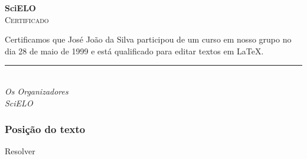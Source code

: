 \begin{frame}[plain]
  \begin{center}
    {\huge\textbf{SciELO}}\\[2em]
    {\LARGE\textsc{Certificado}}
  \end{center}

    \noindent Certificamos que José João da Silva participou de um curso em
    nosso grupo no dia 28 de maio de 1999 e está qualificado para editar textos
    em \LaTeX.

    \vfill
    \begin{flushright}
      \rule{}{.4pt}\\
      \emph{Os Organizadores}\\
      \emph{SciELO}\\
    \end{flushright}
\end{frame}

\begin{frame}
  \frametitle{Posição do texto}
  \huge
  Resolver 
\end{frame}

